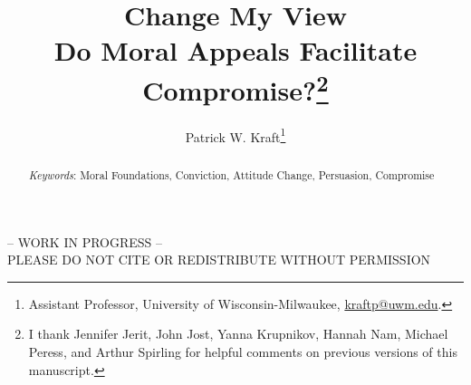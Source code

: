 \documentclass[12pt]{article}
\author{Patrick W. Kraft\footnote{Assistant Professor, University of Wisconsin-Milwaukee, \href{mailto:kraftp@uwm.edu}{kraftp@uwm.edu}.
}}
\title{Change My View\\
\large{Do Moral Appeals Facilitate Compromise?}\footnote{I thank Jennifer Jerit, John Jost, Yanna Krupnikov, Hannah Nam, Michael Peress, and Arthur Spirling for helpful comments on previous versions of this manuscript. %
}}
\date{}
\begin{document}
\maketitle
\doublespacing
\thispagestyle{empty}

\begin{center}
-- WORK IN PROGRESS -- \\
PLEASE DO NOT CITE OR REDISTRIBUTE WITHOUT PERMISSION
\end{center} 

\hfill
\begin{abstract}\singlespacing
\noindent 


\vspace{\baselineskip}
\noindent \textit{Keywords}: Moral Foundations, Conviction, Attitude Change, Persuasion, Compromise
\end{abstract}
\hfill

\newpage\setcounter{page}{1}


\clearpage
\singlespacing


\end{document}
